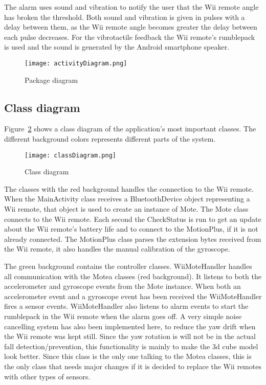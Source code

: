 The alarm uses sound and vibration to notify the user that the Wii remote angle has broken the threshold. Both sound and vibration is given in pulses with a delay between them, as the Wii remote angle becomes greater the delay between each pulse decreases. For the vibrotactile feedback the Wii remote's rumblepack is used and the sound is generated by the Android smartphone speaker. 

\begin{figure}[h!]
  \centering
    \texttt{[image: activityDiagram.png]}
    \caption{\footnotesize Package diagram}
    \label{fig:activityDiagram}
\end{figure}

\subsection{Class diagram}
Figure~\ref{fig:classDiagram} shows a class diagram of the application's most important classes. The different background colors represents different parts of the system.

\begin{figure}[h!]
	\centering
	\texttt{[image: classDiagram.png]}
	\caption{\footnotesize Class diagram}
	\label{fig:classDiagram}
\end{figure}

The classes with the red background handles the connection to the Wii remote. When the MainActivity class receives a BluetoothDevice object representing a Wii remote, that object is used to create an instance of Mote. The Mote class connects to the Wii remote. Each second the CheckStatus is run to get an update about the Wii remote's battery life and to connect to the MotionPlus, if it is not already connected. The MotionPlus class parses the extension bytes received from the Wii remote, it also handles the manual calibration of the gyroscope.

The green background contains the controller classes. WiiMoteHandler handles all communication with the Motea classes (red background). It listens to both the accelerometer and gyroscope events from the Mote instance. When both an accelerometer event and a gyroscope event has been received the WiiMoteHandler fires a sensor events. WiiMoteHandler also listens to alarm events to start the rumblepack in the Wii remote when the alarm goes off.  A very simple noise cancelling system has also been implemented here, to reduce the yaw drift when the Wii remote was kept still. Since the yaw rotation is will not be in the actual fall detection/prevention, this functionality is mainly to make the 3d cube model look better. Since this class is the only one talking to the Motea classes, this is the only class that needs major changes if it is decided to replace the Wii remotes with other types of sensors.

